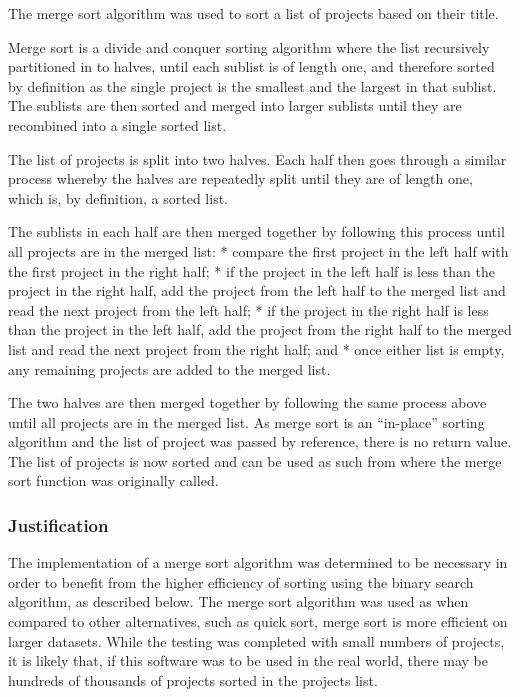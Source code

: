 \documentclass[
  english,
  a4paper,
,tablecaptionabove
]{scrartcl}
\begin{document}
The merge sort algorithm was used to sort a list of projects based on
their title.

Merge sort is a divide and conquer sorting algorithm where the list
recursively partitioned in to halves, until each sublist is of length
one, and therefore sorted by definition as the single project is the
smallest and the largest in that sublist. The sublists are then sorted
and merged into larger sublists until they are recombined into a single
sorted list.

The list of projects is split into two halves. Each half then goes
through a similar process whereby the halves are repeatedly split until
they are of length one, which is, by definition, a sorted list.

The sublists in each half are then merged together by following this
process until all projects are in the merged list: * compare the first
project in the left half with the first project in the right half; * if
the project in the left half is less than the project in the right half,
add the project from the left half to the merged list and read the next
project from the left half; * if the project in the right half is less
than the project in the left half, add the project from the right half
to the merged list and read the next project from the right half; and *
once either list is empty, any remaining projects are added to the
merged list.

The two halves are then merged together by following the same process
above until all projects are in the merged list. As merge sort is an
\enquote{in-place} sorting algorithm and the list of project was passed
by reference, there is no return value. The list of projects is now
sorted and can be used as such from where the merge sort function was
originally called.

\hypertarget{justification}{%
\subsubsection{Justification}\label{justification}}

The implementation of a merge sort algorithm was determined to be
necessary in order to benefit from the higher efficiency of sorting
using the binary search algorithm, as described below. The merge sort
algorithm was used as when compared to other alternatives, such as quick
sort, merge sort is more efficient on larger datasets. While the testing
was completed with small numbers of projects, it is likely that, if this
software was to be used in the real world, there may be hundreds of
thousands of projects sorted in the projects list.
\end{document}
